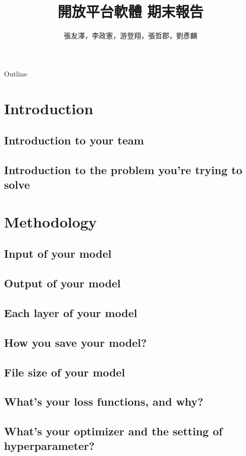 \documentclass{beamer}
\begin{document}
\begin{CJK}{UTF8}{nkai}
\title{開放平台軟體 期末報告}
\author{張友澤，李政憲，游登翔，張哲郡，劉彥麟}

\begin{frame}
  \titlepage
\end{frame}

\begin{frame}[shrink]{Outline}
  \tableofcontents
\end{frame}


\section{ Introduction}
\subsection{Introduction to your team}
\subsection{Introduction to the problem you're trying to solve}

\section{Methodology}
\subsection{Input of your model}
\subsection{Output of your model}
\subsection{Each layer of your model}
\subsection{How you save your model?}
\subsection{File size of your model}
\subsection{What's your loss functions, and why?}
\subsection{What's your optimizer and the setting of hyperparameter?}


\end{CJK}
\end{document}
